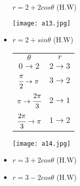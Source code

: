 \begin{example}
\begin{itemize}
\begin{minipage}{0.6\textwidth}
$r=2+2cos\theta$ (H.W)
\end{minipage}
\begin{minipage}{0.5\textwidth}
\texttt{[image: a13.jpg]}\\
\end{minipage}
\item $r=2+sin\theta$ (H.W)\\
\begin{minipage}{0.6\textwidth}
	\begin{tabular}{ |c | c |  }
	\hline
	$\theta$ & $r$ \\
{\color{red}$0 \rightarrow 2$} & {\color{red} $2 \rightarrow 3$} \\
{\color{red} $\cfrac{\pi}{2} \rightarrow \pi $} & {\color{red}$3 \rightarrow 2$} \\
{\color{red}$\pi \rightarrow \cfrac{2\pi}{3}$} & {\color{red}$2 \rightarrow 1$}\\
{\color{red}$\cfrac{2\pi}{3}\rightarrow \pi $ } & {\color{red}$1 \rightarrow 2$}
	\end{tabular}
\end{minipage}
\begin{minipage}{0.5\textwidth}
\texttt{[image: a14.jpg]}\\
\end{minipage}
\item $r=3+2cos\theta$ (H.W)
\item $r=3-2cos\theta$ (H.W)
\end{itemize}
\end{example}
\noindent{\color{smalt(darkpowderblue)}\rule{\linewidth}{.2mm}}
